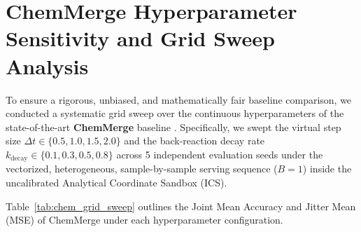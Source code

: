 \documentclass{article}
\theoremstyle{plain}
\theoremstyle{definition}
\theoremstyle{remark}
\begin{document}










\newpage
\appendix
\onecolumn
\section{ChemMerge Hyperparameter Sensitivity and Grid Sweep Analysis}
\label{app:chemmerge_sweep}

To ensure a rigorous, unbiased, and mathematically fair baseline comparison, we conducted a systematic grid sweep over the continuous hyperparameters of the state-of-the-art \textbf{ChemMerge} baseline \cite{chemmerge}. Specifically, we swept the virtual step size $\Delta t \in \{0.5, 1.0, 1.5, 2.0\}$ and the back-reaction decay rate $k_{\text{decay}} \in \{0.1, 0.3, 0.5, 0.8\}$ across 5 independent evaluation seeds under the vectorized, heterogeneous, sample-by-sample serving sequence ($B=1$) inside the uncalibrated Analytical Coordinate Sandbox (ICS).

Table~\ref{tab:chem_grid_sweep} outlines the Joint Mean Accuracy and Jitter Mean (MSE) of ChemMerge under each hyperparameter configuration.
\end{document}
